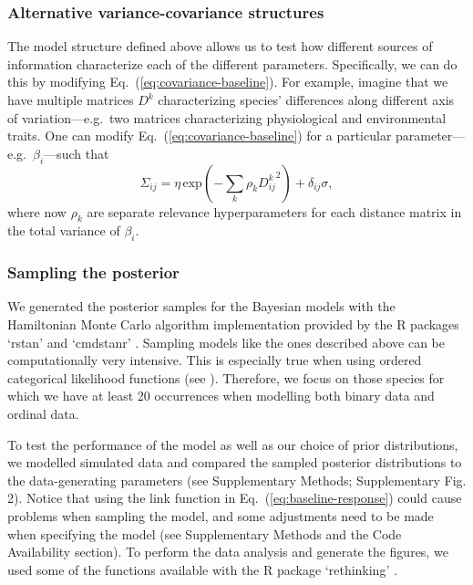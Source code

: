 \documentclass[11pt, a4paper]{article}
\begin{document}
\subsubsection*{Alternative variance-covariance structures}
The model structure defined above allows us to test how different sources of information characterize each of the different parameters. Specifically, we can do this by modifying Eq.~(\ref{eq:covariance-baseline}). For example, imagine that we have multiple matrices $D^k$ characterizing species' differences along different axis of variation---e.g.~two matrices characterizing physiological and environmental traits. One can modify Eq.~(\ref{eq:covariance-baseline}) for a particular parameter---e.g.~$\beta_{i}$---such that
\begin{equation} 
\Sigma_{ij} = \eta\,\text{exp}\left(-\sum_k\rho_{k} {D^{k}_{ij}}^2\right) + \delta_{ij} \sigma ,
\label{eq:covariance-complex}
\end{equation}
where now $\rho_{k}$ are separate relevance hyperparameters for each distance matrix in the total variance of $\beta_i$.

\subsubsection*{Sampling the posterior}
We generated the posterior samples for the Bayesian models with the Hamiltonian Monte Carlo algorithm implementation provided by the R packages `rstan' and `cmdstanr' \citep{standevelopentteamRStanInterfaceStan2021}. Sampling models like the ones described above can be computationally very intensive. This is especially true when using ordered categorical likelihood functions (see \citealt{standevelopmentteamStanModelingLanguage2021}). Therefore, we focus on those species for which we have at least 20 occurrences when modelling both binary data and ordinal data.

To test the performance of the model as well as our choice of prior distributions, we modelled simulated data and compared the sampled posterior distributions to the data-generating parameters (see Supplementary Methods; Supplementary Fig. 2). Notice that using the link function in Eq.~(\ref{eq:baseline-response}) could cause problems when sampling the model, and some adjustments need to be made when specifying the model (see Supplementary Methods and the Code Availability section). To perform the data analysis and generate the figures, we used some of the functions available with the R package `rethinking' \citep{mcelreathStatisticalRethinkingBayesian2020}.
\end{document}
